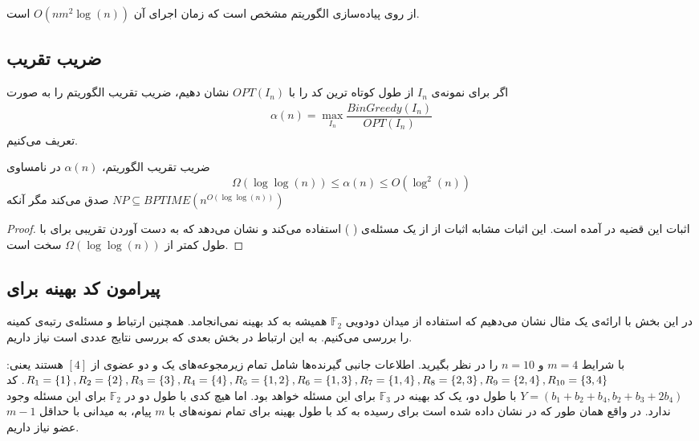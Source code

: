 از روی پیاده‌سازی الگوریتم مشخص است که زمان اجرای آن
$O(nm^2 \log(n))$
است.
\subsection{
ضریب تقریب
}
\begin{definition}
اگر برای نمونه‌ی
$I_n$
از 
\picod
طول کوتاه ترین کد را با
$OPT(I_n)$
نشان دهیم، ضریب تقریب الگوریتم را به صورت
 \begin{align}
 	\alpha(n) = \max\limits_{I_n} \dfrac{BinGreedy(I_n)}{OPT(I_n)}
 \end{align}
تعریف می‌کنیم.
\end{definition}


\begin{theorem}
	\label{theorem:pliable2016:theorem2}
	ضریب تقریب الگوریتم،
	$\alpha(n)$
	در نامساوی
	$$\Omega(\log \log (n)) \leq \alpha(n) \leq O(\log^2(n))$$
	صدق می‌کند مگر آنکه
	$NP \subseteq BPTIME(n^{O(\log \log (n))})$
\end{theorem}
\begin{proof}
	اثبات این قضیه در
	\cite{song2016deterministic}
	آمده است. این اثبات مشابه اثبات
	\cite{ELKIN20048}
	از 
	از یک مسئله‌ی 
	\nphard
	(
	) استفاده می‌کند و نشان می‌دهد که به دست آوردن تقریبی برای
	\picod
	با طول کمتر از
	$\Omega(\log \log (n))$
	سخت است.
\end{proof}

\subsection{
پیرامون کد بهینه برای
\picod
}
در این بخش با ارائه‌ی یک مثال نشان می‌دهیم که استفاده از میدان دودویی
$\mathbb{F}_2$
همیشه به کد بهینه نمی‌انجامد. همچنین ارتباط
\picod
و مسئله‌ی رتبه‌ی کمینه را بررسی می‌کنیم. به این ارتباط در بخش بعدی که بررسی نتایج عددی است نیاز داریم.
\begin{example}
	\picod
	با شرایط
	$m = 4$
	و
	$n = 10$
	را در نظر بگیرید. اطلاعات جانبی گیرنده‌ها شامل تمام زیرمجوعه‌های یک و دو عضوی از
	$[4]$
	هستند یعنی:
	$R_1 = \left\{ 1 \right\}, R_2 = \left\{ 2 \right\}, R_3 = \left\{ 3 \right\}, R_4 = \left\{ 4 \right\}, R_5 = \left\{ 1, 2 \right\}, R_6 = \left\{ 1, 3 \right\}, R_7 = \left\{ 1, 4 \right\}, R_8 = \left\{ 2, 3 \right\}, R_9 = \left\{ 2, 4 \right\}, R_{10} = \left\{ 3, 4 \right\}$.
	کد
	$Y = (b_1 + b_2 + b_4, b_2+b_3+2b_4)$
	با طول دو، یک کد بهینه در
	$\mathbb{F}_3$
	برای این مسئله خواهد بود. اما هیچ کدی با طول دو در
	$\mathbb{F}_2$
	برای این مسئله وجود ندارد. در واقع همان طور که در
	\cite{song2016deterministic}
	نشان داده شده است برای رسیده به کد با طول بهینه برای تمام نمونه‌های با
	$m$
	پیام، به میدانی با حداقل
	$m - 1$
	عضو نیاز داریم.
\end{example}

